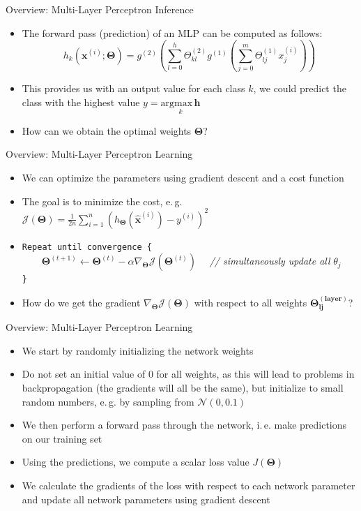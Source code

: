 \begin{frame}{Overview: Multi-Layer Perceptron Inference}{}
	\begin{itemize}
		\item The forward pass (prediction) of an MLP can be computed as follows:
		$$h_k(\bm{x}^{(i)}; \bm{\Theta}) = g^{(2)}\left( \sum_{l=0}^h \Theta_{kl}^{(2)} g^{(1)}\left( \sum_{j=0}^m \Theta_{lj}^{(1)} x_{j}^{(i)} \right) \right)$$
		\item This provides us with an output value for each class $k$, we could predict the class with the highest value $y = \underset{k}{\text{argmax}\,\bm{h}}$
		\item How can we obtain the optimal weights $\bm{\Theta}$?
	\end{itemize}
\end{frame}

\begin{frame}{Overview: Multi-Layer Perceptron Learning}{}
	\begin{itemize}
		\item We can optimize the parameters using gradient descent and a cost function
		\item The goal is to minimize the cost, e.\,g. $\mathcal{J}(\bm{\Theta}) = \frac{1}{2n} \sum_{i=1}^n (h_{\bm{\Theta}}(\bm{\widehat{x}}^{(i)}) - y^{(i)})^2$
		\item \texttt{Repeat until convergence \{} \\
			$\qquad \bm{\Theta}^{(t+1)} \longleftarrow \bm{\Theta}^{(t)} - \alpha \nabla_{\bm{\Theta}}
				\mathcal{J}(\bm{\Theta}^{(t)}) \quad$
			\textcolor{myblue1}{\textit{// simultaneously update all} $\theta_j$} \\
		\texttt{\}}
		\item How do we get the gradient $\nabla_{\bm{\Theta}} \mathcal{J}(\bm{\Theta})$ with respect to all weights $\bm{\Theta^{(\text{layer})}_{lj}}$?
	\end{itemize}
\end{frame}

\begin{frame}{Overview: Multi-Layer Perceptron Learning}{}
	\begin{itemize}
		\item We start by randomly initializing the network weights
		\item Do not set an initial value of 0 for all weights, as this will lead to problems in backpropagation (the gradients will all be the same), but initialize to small random numbers, e.\,g. by sampling from $\mathcal{N}(0, 0.1)$
		\item We then perform a forward pass through the network, i.\,e. make predictions on our training set
		\item Using the predictions, we compute a scalar loss value $J(\bm{\Theta})$
		\item We calculate the gradients of the loss with respect to each network parameter and update all network parameters using gradient descent
	\end{itemize}
\end{frame}



